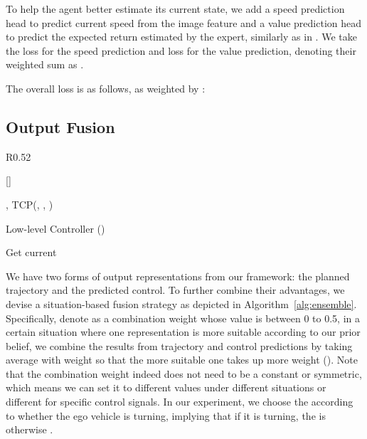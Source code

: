 \documentclass{article}
\begin{document}
To help the agent better estimate its current state, we add a speed prediction head to predict current speed  from the image feature and a value prediction head to predict the expected return estimated by the expert, similarly as in \cite{zhang2021roach}. We take the  loss for the speed prediction and  loss for the value prediction, denoting their weighted sum as .

The overall loss is as follows, as weighted by :

    
\subsection{Output Fusion} \label{sec:ensemble}
\begin{wrapfigure}{R}{0.52\textwidth}

\footnotesize
\raisebox{0pt}[\dimexpr{}\baselineskip\relax]{
\begin{algorithm}[H]
\SetAlgoLined
{}
\BlankLine

,   TCP(, , )

  Low-level Controller ()

Get current 

{  }
{  }

 \caption{\footnotesize Situation based fusion scheme to combine the two output paradigms}
 \label{alg:ensemble}
\end{algorithm}
}
\end{wrapfigure}


We have two forms of output representations from our \algname framework: the planned trajectory and the predicted control. To further combine their advantages, we devise a situation-based fusion strategy as depicted in Algorithm~\ref{alg:ensemble}. Specifically, denote  as a combination weight whose value is between 0 to 0.5, in a certain situation where one representation is more suitable according to our prior belief, we combine the results from trajectory and control predictions by taking average with weight  so that the more suitable one takes up more weight (). Note that the combination weight  indeed does not need to be a constant or symmetric, which means we can set it to different values under different situations or different for specific control signals. In our experiment, we choose the  according to whether the ego vehicle is turning, implying that if it is turning, the  is  otherwise .
\end{document}

